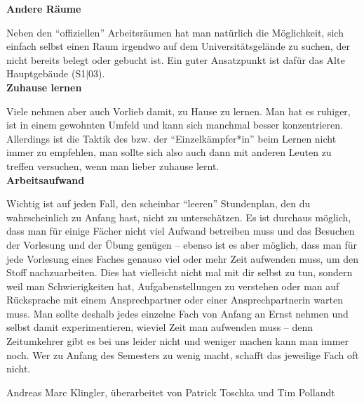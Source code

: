 {    \noindent\textbf{Andere Räume}

    Neben den "`offiziellen"' Arbeitsräumen hat man natürlich die Möglichkeit, sich einfach selbst einen Raum irgendwo auf dem Universitätsgelände zu suchen, der nicht bereits belegt oder gebucht ist. Ein guter Ansatzpunkt ist dafür das Alte Hauptgebäude (S1$|$03).\\

    \noindent\textbf{Zuhause lernen}

    Viele nehmen aber auch Vorlieb damit, zu Hause zu lernen. Man hat es ruhiger, ist in einem gewohnten Umfeld und kann sich manchmal besser konzentrieren. Allerdings ist die Taktik des bzw. der "`Einzelkämpfer*in"' beim Lernen nicht immer zu empfehlen, man sollte sich also auch dann mit anderen Leuten zu treffen versuchen, wenn man lieber zuhause lernt.\\

    \noindent\textbf{Arbeitsaufwand}

    Wichtig ist auf jeden Fall, den scheinbar "`leeren"' Stundenplan, den du wahrscheinlich zu Anfang hast, nicht zu unterschätzen. Es ist durchaus möglich, dass man für einige Fächer nicht viel Aufwand betreiben muss und das Besuchen der Vorlesung und der Übung genügen – ebenso ist es aber möglich, dass man für jede Vorlesung eines Faches genauso viel oder mehr Zeit aufwenden muss, um den Stoff nachzuarbeiten. Dies hat vielleicht nicht mal mit dir selbst zu tun, sondern weil man Schwierigkeiten hat, Aufgabenstellungen zu verstehen oder man auf Rücksprache mit einem Ansprechpartner oder einer Ansprechpartnerin warten muss. Man sollte deshalb jedes einzelne Fach von Anfang an Ernst nehmen und selbst damit experimentieren, wieviel Zeit man aufwenden muss – denn Zeitumkehrer gibt es bei uns leider nicht und weniger machen kann man immer noch. Wer zu Anfang des Semesters zu wenig macht, schafft das jeweilige Fach oft nicht.
}
{Andreas Marc Klingler, überarbeitet von Patrick Toschka und Tim Pollandt}
